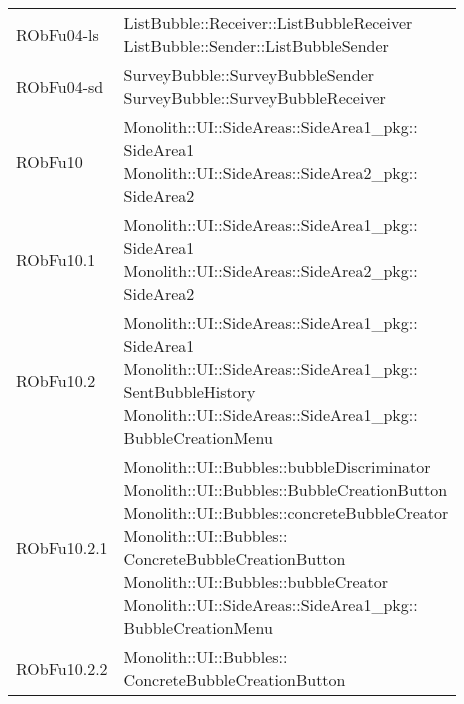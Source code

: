 \begin{center}
\begin{longtable}{|
*{1}{>{\centering\arraybackslash}m{2.5cm}|}
*{1}{>{\centering\arraybackslash}m{7.5cm}|}}
{\\}\\\hline
RObFu04-ls & \makecell[l]{ListBubble::Receiver::ListBubbleReceiver
\\ListBubble::Sender::ListBubbleSender
\\}\\\hline
RObFu04-sd & \makecell[l]{SurveyBubble::SurveyBubbleSender
\\SurveyBubble::SurveyBubbleReceiver
\\}\\\hline
RObFu10 & \makecell[l]{Monolith::UI::SideAreas::SideArea1\_pkg:: \\ \hfill SideArea1
\\Monolith::UI::SideAreas::SideArea2\_pkg:: \\ \hfill SideArea2
\\}\\\hline
RObFu10.1 & \makecell[l]{Monolith::UI::SideAreas::SideArea1\_pkg:: \\ \hfill SideArea1
\\Monolith::UI::SideAreas::SideArea2\_pkg:: \\ \hfill SideArea2
\\}\\\hline
RObFu10.2 & \makecell[l]{Monolith::UI::SideAreas::SideArea1\_pkg:: \\ \hfill SideArea1
\\Monolith::UI::SideAreas::SideArea1\_pkg:: \\ \hfill SentBubbleHistory
\\Monolith::UI::SideAreas::SideArea1\_pkg:: \\ \hfill BubbleCreationMenu
\\}\\\hline
RObFu10.2.1 & \makecell[l]{Monolith::UI::Bubbles::bubbleDiscriminator
\\Monolith::UI::Bubbles::BubbleCreationButton
\\Monolith::UI::Bubbles::concreteBubbleCreator
\\Monolith::UI::Bubbles:: \\ \hfill ConcreteBubbleCreationButton
\\Monolith::UI::Bubbles::bubbleCreator
\\Monolith::UI::SideAreas::SideArea1\_pkg:: \\ \hfill BubbleCreationMenu
\\}\\\hline
RObFu10.2.2 & \makecell[l]{Monolith::UI::Bubbles:: \\ \hfill ConcreteBubbleCreationButton
}
\end{longtable}
\end{center}
